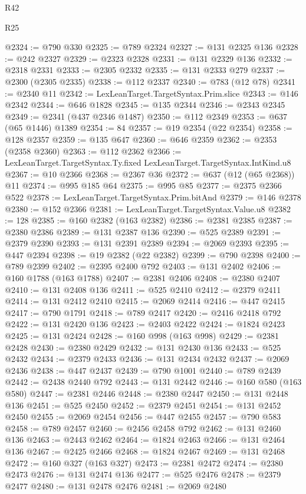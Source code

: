 \begin{lexlean}{R42}
\begin{lexlean}{R25}
\begin{coremodule}
{{{{{{{{{{{{{{{{{{{{{{{{{{{{{{{{{{{{{{{{{{{{{{{{{{{{{{{{{{{{{{{{{{{{{{{{{{{{{{{{{{{{{{{{{{{{{{{{{{{{{{{{{{{{{{{{{{{{{{{{{{{{{{{{{{{{{{{{{{{{{{{{{{{{{{{{{{{{{{{{{{{{{{{{{{{{{{{{{{{{{{{{{{{{{{{{{{{{{{{@2324 := @790 @330
@2325 := @789 @2324
@2327 := @131 @2325 @136
@2328 := @242 @2327
@2329 := @2323 @2328
@2331 := @131 @2329 @136
@2332 := @2318 @2331
@2333 := @2305 @2332
@2335 := @131 @2333 @279
@2337 := @2300 (@2305 @2335)
@2338 := @112 @2337
@2340 := @783 (@12 @78)
@2341 := @2340 @11
@2342 := LexLeanTarget.TargetSyntax.Prim.slice
@2343 := @146 @2342
@2344 := @646 @1828
@2345 := @135 @2344
@2346 := @2343 @2345
@2349 := @2341 (@437 @2346 @1487)
@2350 := @112 @2349
@2353 := @637 (@65 @1446) @1389
@2354 := 84
@2357 := @19 @2354 (@22 @2354)
@2358 := @128 @2357
@2359 := @135 @647
@2360 := @646 @2359
@2362 := @2353 (@2358 @2360)
@2363 := @112 @2362
@2366 := LexLeanTarget.TargetSyntax.Ty.fixed LexLeanTarget.TargetSyntax.IntKind.u8
@2367 := @10 @2366
@2368 := @2367 @36
@2372 := @637 (@12 (@65 @2368)) @11
@2374 := @995 @185 @64
@2375 := @995 @85
@2377 := @2375 @2366 @522
@2378 := LexLeanTarget.TargetSyntax.Prim.bitAnd
@2379 := @146 @2378
@2380 := @152 @2366
@2381 := LexLeanTarget.TargetSyntax.Value.u8
@2382 := 128
@2385 := @160 @2382 (@163 @2382)
@2386 := @2381 @2385
@2387 := @2380 @2386
@2389 := @131 @2387 @136
@2390 := @525 @2389
@2391 := @2379 @2390
@2393 := @131 @2391 @2389
@2394 := @2069 @2393
@2395 := @447 @2394
@2398 := @19 @2382 (@22 @2382)
@2399 := @790 @2398
@2400 := @789 @2399
@2402 := @2395 @2400 @792
@2403 := @131 @2402
@2406 := @160 @1788 (@163 @1788)
@2407 := @2381 @2406
@2408 := @2380 @2407
@2410 := @131 @2408 @136
@2411 := @525 @2410
@2412 := @2379 @2411
@2414 := @131 @2412 @2410
@2415 := @2069 @2414
@2416 := @447 @2415
@2417 := @790 @1791
@2418 := @789 @2417
@2420 := @2416 @2418 @792
@2422 := @131 @2420 @136
@2423 := @2403 @2422
@2424 := @1824 @2423
@2425 := @131 @2424
@2428 := @160 @998 (@163 @998)
@2429 := @2381 @2428
@2430 := @2380 @2429
@2432 := @131 @2430 @136
@2433 := @525 @2432
@2434 := @2379 @2433
@2436 := @131 @2434 @2432
@2437 := @2069 @2436
@2438 := @447 @2437
@2439 := @790 @1001
@2440 := @789 @2439
@2442 := @2438 @2440 @792
@2443 := @131 @2442
@2446 := @160 @580 (@163 @580)
@2447 := @2381 @2446
@2448 := @2380 @2447
@2450 := @131 @2448 @136
@2451 := @525 @2450
@2452 := @2379 @2451
@2454 := @131 @2452 @2450
@2455 := @2069 @2454
@2456 := @447 @2455
@2457 := @790 @583
@2458 := @789 @2457
@2460 := @2456 @2458 @792
@2462 := @131 @2460 @136
@2463 := @2443 @2462
@2464 := @1824 @2463
@2466 := @131 @2464 @136
@2467 := @2425 @2466
@2468 := @1824 @2467
@2469 := @131 @2468
@2472 := @160 @327 (@163 @327)
@2473 := @2381 @2472
@2474 := @2380 @2473
@2476 := @131 @2474 @136
@2477 := @525 @2476
@2478 := @2379 @2477
@2480 := @131 @2478 @2476
@2481 := @2069 @2480
}}}}}}}}}}}}}}}}}}}}}}}}}}}}}}}}}}}}}}}}}}}}}}}}}}}}}}}}}}}}}}}}}}}}}}}}}}}}}}}}}}}}}}}}}}}}}}}}}}}}}}}}}}}}}}}}}}}}}}}}}}}}}}}}}}}}}}}}}}}}}}}}}}}}}}}}}}}}}}}}}}}}}}}}}}}}}}}}}}}}}}}}}}}}}}}}}}}}}}}
\end{coremodule}
\end{lexlean}
\end{lexlean}
